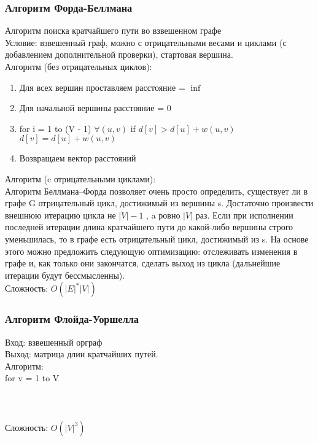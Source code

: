 \documentclass[a4paper]{article}
\begin{document}
\subsubsection{Алгоритм Форда-Беллмана}
Алгоритм поиска кратчайшего пути во взвешенном графе\\
Условие: взвешенный граф, можно с отрицательными весами и циклами (с добавлением дополнительной проверки), стартовая вершина.\\
Алгоритм (без отрицательных циклов):
\begin{enumerate}
	\item Для всех вершин проставляем расстояние = $\inf$
	\item Для начальной вершины расстояние = 0
	\item for i = 1 to (V - 1)
			$\forall (u ,v)$
				if $d[v] >  d[u] + w(u,v)$
					$d[v] = d[u] + w(u,v)$
	\item Возвращаем вектор расстояний
\end{enumerate}
Алгоритм (c отрицательными циклами):\\
Алгоритм Беллмана–Форда позволяет очень просто определить, существует ли в графе G отрицательный цикл, достижимый из вершины s. Достаточно произвести внешнюю итерацию цикла не $|V|-1$ , a ровно $|V|$ раз. Если при исполнении последней итерации длина кратчайшего пути до какой-либо вершины строго уменьшилась, то в графе есть отрицательный цикл, достижимый из s. На основе этого можно предложить следующую оптимизацию: отслеживать изменения в графе и, как только они закончатся, сделать выход из цикла (дальнейшие итерации будут бессмысленны).\\
Сложность: $O(|E|^*|V|)$

\subsubsection{Алгоритм Флойда-Уоршелла}
Вход: взвешенный орграф\\
Выход: матрица длин кратчайших путей.\\
Алгоритм:\\
for v = 1 to V\\
	\\
			\\
				 \\
Сложность: $O(|V|^3)$
\end{document}
